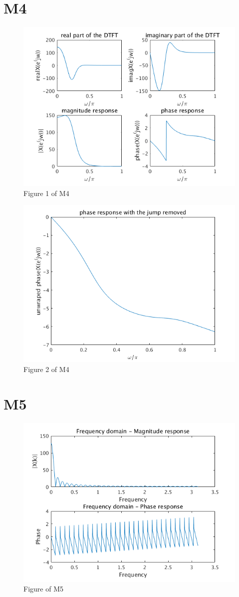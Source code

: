 \documentclass[11pt,a4paper,twoside]{article}
\begin{document}
\section{M4}

\begin{figure}[H]
\centering
\includegraphics[width=0.8\linewidth]{img/m4_1}
\caption{Figure 1 of M4}
\label{Figure 1 of M4}
\end{figure}
\begin{figure}[H]
\centering
\includegraphics[width=0.8\linewidth]{img/m4_2}
\caption{Figure 2 of M4}
\label{Figure 2 of M4}
\end{figure}

\section{M5}

\begin{figure}[H]
\centering
\includegraphics[width=0.8\linewidth]{img/m5}
\caption{Figure of M5}
\label{Figure of M5}
\end{figure}
\end{document}
